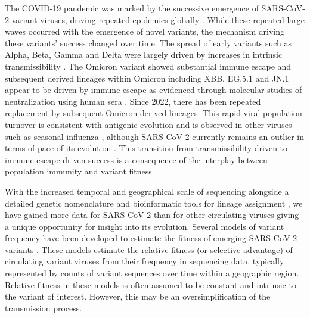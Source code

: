 \documentclass[11pt,oneside,letterpaper]{article}
\begin{document}
The COVID-19 pandemic was marked by the successive emergence of SARS-CoV-2 variant viruses, driving repeated epidemics globally \cite{tegally2021detection, Volz2021}.
While these repeated large waves occurred with the emergence of novel variants, the mechanism driving these variants' success changed over time.
The spread of early variants such as Alpha, Beta, Gamma and Delta were largely driven by increases in intrinsic transmissibility \cite{carabelli2023sars}.
The Omicron variant showed substantial immune escape \cite{carabelli2023sars} and subsequent derived lineages within Omicron including XBB, EG.5.1 and JN.1 appear to be driven by immune escape as evidenced through molecular studies of neutralization using human sera \cite{Cao2021, Cao2022, Bekliz2024, Jian2023}.
Since 2022, there has been repeated replacement by subsequent Omicron-derived lineages.
This rapid viral population turnover is consistent with antigenic evolution and is observed in other viruses such as seasonal influenza \cite{bedford2014integrating}, although SARS-CoV-2 currently remains an outlier in terms of pace of its evolution \cite{kistler2023atlas}.
This transition from transmissibility-driven to immune escape-driven success is a consequence of the interplay between population immunity and variant fitness.


With the increased temporal and geographical scale of sequencing alongside a detailed genetic nomenclature \cite{rambaut2020dynamic} and bioinformatic tools for lineage assignment \cite{turakhia2021ultrafast, aksamentov2021nextclade}, we have gained more data for SARS-CoV-2 than for other circulating viruses giving a unique opportunity for insight into its evolution.
Several models of variant frequency have been developed to estimate the fitness of emerging SARS-CoV-2 variants \cite{Annavajhala2021, Piantham2022, figgins2022sars, susswein2023leveraging, Lefrancq2023, abousamra2024fitness}.
These models estimate the relative fitness (or selective advantage) of circulating variant viruses from their frequency in sequencing data, typically represented by counts of variant sequences over time within a geographic region.
Relative fitness in these models is often assumed to be constant and intrinsic to the variant of interest.
However, this may be an oversimplification of the transmission process.
\end{document}
